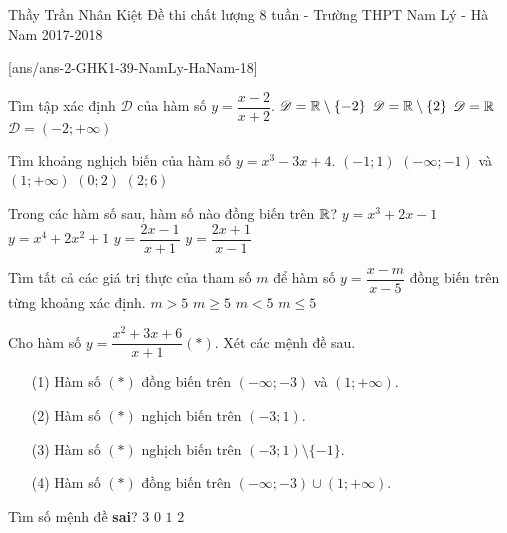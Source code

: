 
\begin{name}
{Thầy Trần Nhân Kiệt}
{Đề thi chất lượng 8 tuần - Trường THPT Nam Lý - Hà Nam 2017-2018}
\end{name}
\setcounter{ex}{0}
[ans/ans-2-GHK1-39-NamLy-HaNam-18]
\begin{ex}%
	Tìm tập xác định $\mathscr D$ của hàm số $y=\dfrac{x-2}{x+2}.$
	\choice
	{\True $\mathscr D=\Bbb{R}\setminus \{-2\}$}
	{$\mathscr D=\Bbb{R}\setminus \{2\}$}
	{$\mathscr D=\Bbb{R}$}
	{$\mathscr D=(-2;+\infty)$}
\end{ex}
\begin{ex}%
	Tìm khoảng nghịch biến của hàm số $y=x^3-3x+4.$
	\choice
	{\True $(-1;1)$}
	{$(-\infty;-1)$ và $(1;+\infty)$}
	{$(0;2)$}
	{$(2;6)$}
		
\end{ex}
\begin{ex}%
	Trong các hàm số sau, hàm số nào đồng biến trên $\Bbb{R}$?
	\choice
	{\True $y=x^3+2x-1$}
	{$y=x^4+2x^2+1$}
	{$y=\dfrac{2x-1}{x+1}$}
	{$y=\dfrac{2x+1}{x-1}$}
		
\end{ex}
\begin{ex}%
	Tìm tất cả các giá trị thực của tham số $m$ để hàm số $y=\dfrac{x-m}{x-5}$ đồng biến trên từng khoảng xác định.
	\choice
	{\True $m>5$}
	{$m\ge 5$}
	{$m<5$}
	{$m\le 5$}
\end{ex}
\begin{ex}%
	Cho hàm số $y=\dfrac{x^2+3x+6}{x+1} (*)$. Xét các mệnh đề sau.
	\begin{itemize}
		\item[(1)]  Hàm số $(*)$ đồng biến trên $(-\infty;-3)$ và $(1;+\infty).$ %
		\item[(2)]  Hàm số $(*)$ nghịch biến trên $(-3;1).$ %
		\item[(3)]  Hàm số $(*)$ nghịch biến trên $(-3;1)\setminus \{-1\}.$ %
		\item[(4)]  Hàm số $(*)$ đồng biến trên $(-\infty;-3)\cup (1;+\infty).$ %
	\end{itemize}
	Tìm số mệnh đề {\bf sai}?
	\choice
	{\True $3$}
	{$0$}
	{$1$}
	{$2$}
\end{ex}

